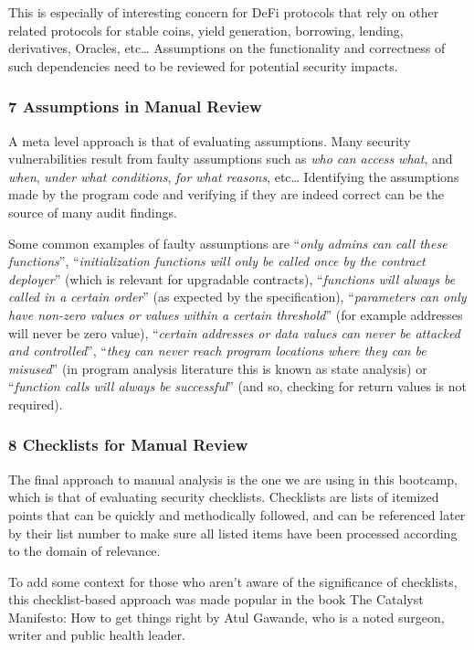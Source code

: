 This is especially of interesting concern for DeFi protocols that rely
on other related protocols for stable coins, yield generation,
borrowing, lending, derivatives, Oracles, etc\ldots{} Assumptions on the
functionality and correctness of such dependencies need to be reviewed
for potential security impacts.

\subsubsection{7 Assumptions in Manual
Review}\label{assumptions-in-manual-review}

A meta level approach is that of evaluating assumptions. Many security
vulnerabilities result from faulty assumptions such as \emph{who can
access what}, and \emph{when}, \emph{under what conditions}, \emph{for
what reasons}, etc\ldots{} Identifying the assumptions made by the
program code and verifying if they are indeed correct can be the source
of many audit findings.

Some common examples of faulty assumptions are ``\emph{only admins can
call these functions}'', ``\emph{initialization functions will only be
called once by the contract deployer}'' (which is relevant for
upgradable contracts), ``\emph{functions will always be called in a
certain order}'' (as expected by the specification), ``\emph{parameters
can only have non-zero values or values within a certain threshold}''
(for example addresses will never be zero value), ``\emph{certain
addresses or data values can never be attacked and controlled}'',
``\emph{they can never reach program locations where they can be
misused}'' (in program analysis literature this is known as state
analysis) or ``\emph{function calls will always be successful}'' (and
so, checking for return values is not required).

\subsubsection{8 Checklists for Manual
Review}\label{checklists-for-manual-review}

The final approach to manual analysis is the one we are using in this
bootcamp, which is that of evaluating security checklists. Checklists
are lists of itemized points that can be quickly and methodically
followed, and can be referenced later by their list number to make sure
all listed items have been processed according to the domain of
relevance.

To add some context for those who aren't aware of the significance of
checklists, this checklist-based approach was made popular in the book
The Catalyst Manifesto: How to get things right by Atul Gawande, who is
a noted surgeon, writer and public health leader.

